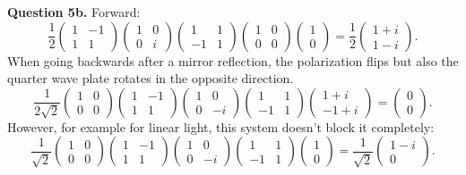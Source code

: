\documentclass[letterpaper, reqno,11pt]{article}
\begin{document}
{\medskip\noindent\bf Question 5b.} Forward:
\[
    \frac{1}{2} \begin{pmatrix} 1&-1\\1&1 \end{pmatrix} \begin{pmatrix} 1&0\\0&i \end{pmatrix} \begin{pmatrix} 1&1\\-1&1 \end{pmatrix} \begin{pmatrix} 1&0\\0&0 \end{pmatrix} \begin{pmatrix} 1\\0 \end{pmatrix} =\frac{1}{2}\begin{pmatrix} 1+i\\1-i \end{pmatrix} 
.\]
When going backwards after a mirror reflection, the polarization flips but also the quarter wave plate rotates in the opposite direction.
\[
\frac{1}{2\sqrt{2}} \begin{pmatrix} 1&0\\0&0 \end{pmatrix} \begin{pmatrix} 1&-1\\1&1 \end{pmatrix} \begin{pmatrix} 1&0\\0&-i \end{pmatrix} \begin{pmatrix} 1&1\\-1&1 \end{pmatrix}\begin{pmatrix} 1+i\\-1+i \end{pmatrix} =\begin{pmatrix} 0\\0 \end{pmatrix} 
.\]
However, for example for linear light, this system doesn't block it completely:
\[
\frac{1}{\sqrt{2}} \begin{pmatrix} 1&0\\0&0 \end{pmatrix} \begin{pmatrix} 1&-1\\1&1 \end{pmatrix} \begin{pmatrix} 1&0\\0&-i \end{pmatrix} \begin{pmatrix} 1&1\\-1&1 \end{pmatrix}\begin{pmatrix} 1\\0 \end{pmatrix} =\frac{1}{\sqrt{2}}\begin{pmatrix} 1-i\\0 \end{pmatrix} 
.\]
\end{document}
